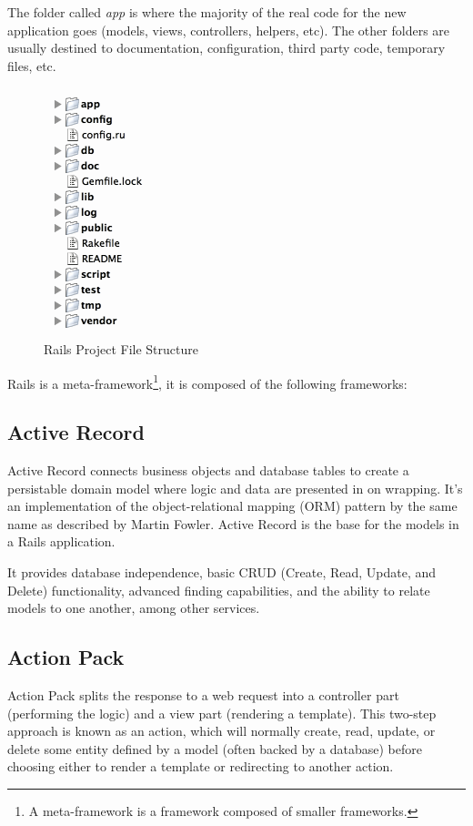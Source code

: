 The folder called \emph{app} 
is where the majority of the real code for the new application goes (models, views, controllers, helpers, etc).
The other folders are usually destined to documentation, configuration, third party code, temporary files, etc.

\begin{figure}[h!]
  \caption{Rails Project File Structure}\label{fig:rails_file_structure}
  \centering
  \includegraphics[scale=0.75]{Images/rails_files}
\end{figure}

Rails is a \textsf{meta-framework}\footnote{
  A meta-framework is a framework composed of smaller frameworks.
}, it is composed of the following frameworks:


\subsection{Active Record}
Active Record connects business objects and database tables to create a persistable domain model where logic and data are presented in on wrapping. It’s an implementation of the object-relational mapping (ORM) pattern by the same name as described by Martin Fowler.
Active Record is the base for the models in a Rails application.

It provides database independence, basic CRUD (Create, Read, Update, and Delete) functionality, advanced finding capabilities, and the ability to relate models to one another, among other services.


\subsection{Action Pack} 
Action Pack splits the response to a web request into a controller part (performing the logic) and a view part (rendering a template). This two-step approach is known as an action, which will normally create, read, update, 
or delete some entity defined by a model (often backed by a database) 
before choosing either to render a template or redirecting to another action.

